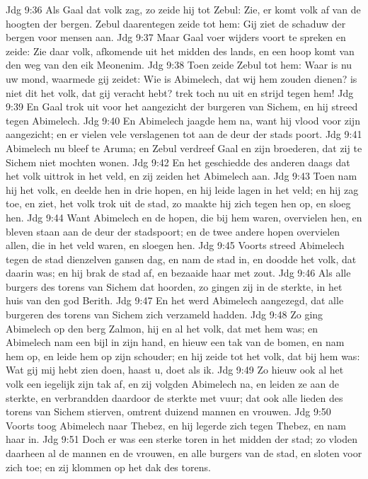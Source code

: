 Jdg 9:36  Als Gaal dat volk zag, zo zeide hij tot Zebul: Zie, er komt volk af van de hoogten der bergen. Zebul daarentegen zeide tot hem: Gij ziet de schaduw der bergen voor mensen aan.
Jdg 9:37  Maar Gaal voer wijders voort te spreken en zeide: Zie daar volk, afkomende uit het midden des lands, en een hoop komt van den weg van den eik Meonenim.
Jdg 9:38  Toen zeide Zebul tot hem: Waar is nu uw mond, waarmede gij zeidet: Wie is Abimelech, dat wij hem zouden dienen? is niet dit het volk, dat gij veracht hebt? trek toch nu uit en strijd tegen hem!
Jdg 9:39  En Gaal trok uit voor het aangezicht der burgeren van Sichem, en hij streed tegen Abimelech.
Jdg 9:40  En Abimelech jaagde hem na, want hij vlood voor zijn aangezicht; en er vielen vele verslagenen tot aan de deur der stads poort.
Jdg 9:41  Abimelech nu bleef te Aruma; en Zebul verdreef Gaal en zijn broederen, dat zij te Sichem niet mochten wonen.
Jdg 9:42  En het geschiedde des anderen daags dat het volk uittrok in het veld, en zij zeiden het Abimelech aan.
Jdg 9:43  Toen nam hij het volk, en deelde hen in drie hopen, en hij leide lagen in het veld; en hij zag toe, en ziet, het volk trok uit de stad, zo maakte hij zich tegen hen op, en sloeg hen.
Jdg 9:44  Want Abimelech en de hopen, die bij hem waren, overvielen hen, en bleven staan aan de deur der stadspoort; en de twee andere hopen overvielen allen, die in het veld waren, en sloegen hen.
Jdg 9:45  Voorts streed Abimelech tegen de stad dienzelven gansen dag, en nam de stad in, en doodde het volk, dat daarin was; en hij brak de stad af, en bezaaide haar met zout.
Jdg 9:46  Als alle burgers des torens van Sichem dat hoorden, zo gingen zij in de sterkte, in het huis van den god Berith.
Jdg 9:47  En het werd Abimelech aangezegd, dat alle burgeren des torens van Sichem zich verzameld hadden.
Jdg 9:48  Zo ging Abimelech op den berg Zalmon, hij en al het volk, dat met hem was; en Abimelech nam een bijl in zijn hand, en hieuw een tak van de bomen, en nam hem op, en leide hem op zijn schouder; en hij zeide tot het volk, dat bij hem was: Wat gij mij hebt zien doen, haast u, doet als ik.
Jdg 9:49  Zo hieuw ook al het volk een iegelijk zijn tak af, en zij volgden Abimelech na, en leiden ze aan de sterkte, en verbrandden daardoor de sterkte met vuur; dat ook alle lieden des torens van Sichem stierven, omtrent duizend mannen en vrouwen.
Jdg 9:50  Voorts toog Abimelech naar Thebez, en hij legerde zich tegen Thebez, en nam haar in.
Jdg 9:51  Doch er was een sterke toren in het midden der stad; zo vloden daarheen al de mannen en de vrouwen, en alle burgers van de stad, en sloten voor zich toe; en zij klommen op het dak des torens.
